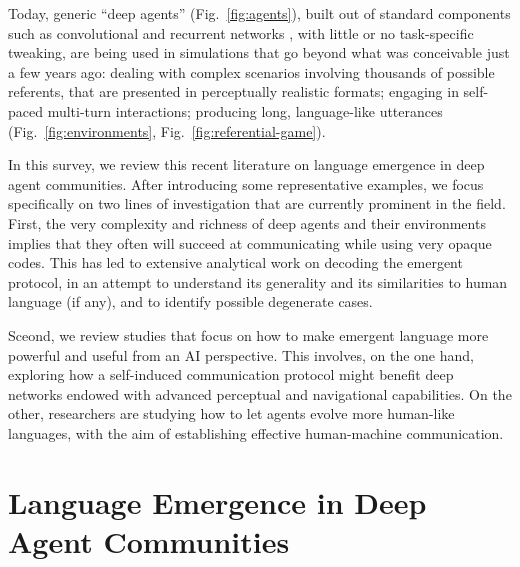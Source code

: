 Today,
generic ``deep agents'' (Fig.~\ref{fig:agents}), built out of standard
components such as convolutional and recurrent
  networks \cite{LeCun:etal:1998,Elman:1990,Hochreiter:Schmidhuber:1997}, with little or no task-specific tweaking,
are being used in simulations that go beyond what was conceivable just
a few years ago: dealing with complex scenarios involving thousands of
possible referents, that are presented in perceptually realistic
formats; engaging in self-paced multi-turn interactions; producing
long, language-like utterances (Fig.~\ref{fig:environments},
Fig.~\ref{fig:referential-game}).







In this survey, we review this recent literature on language emergence
in deep agent communities. After introducing some representative examples, we focus specifically on two lines of
investigation that are currently prominent in the field. First, the very complexity and richness of deep agents and their
environments implies that they often will succeed at communicating while using very opaque codes. This has led
to extensive analytical work on decoding the emergent protocol, in an attempt to understand its generality and its similarities to human language (if any), and to identify possible degenerate cases.

Sceond, we review studies that focus on how to make emergent language more powerful and
useful from an AI perspective. This involves, on the one hand, exploring
how a self-induced communication protocol might benefit deep networks
endowed with advanced perceptual and navigational capabilities. On the
other, researchers are studying how to let agents evolve  more
human-like languages, with the aim of establishing effective human-machine
communication.


\section{Language Emergence in Deep Agent Communities}
\label{sec:new-simulations}


%

%




